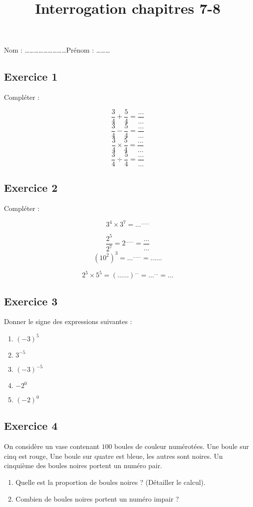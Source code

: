 \documentclass[14 pt]{extarticle}
\title{Interrogation chapitres 7-8}
\date{}
\theoremstyle{plain}
\begin{document}
 
 Nom : \ldots\ldots\ldots\ldots\ldots\ldots\ldots\ldots\ldots Prénom : \ldots\ldots\ldots \\ 
 
 \subsection*{Exercice 1}
 
 Compléter : 
 
 \[ \frac34 + \frac54 = \frac\ldots\ldots   \]
 \[ \frac34 - \frac54 = \frac\ldots\ldots   \]
 \[ \frac34 \times \frac54 = \frac\ldots\ldots   \]
 \[ \frac34 \div \frac54 = \frac\ldots\ldots   \]
 
\subsection*{Exercice 2}

Compléter : 

\[ 3^4 \times 3^7 = \ldots^{\ldots\ldots}
\]

\[ \frac{2^5}{2^7} = 2^{\ldots\ldots} =\frac{\ldots}{\ldots}  \]
\[(10^2)^3 = \ldots^{\ldots\ldots} = \ldots\ldots\]

\[ 2^5 \times 5^5 = ({\ldots\ldots})^{\ldots} = {\ldots}^{\ldots} = \ldots\]

 
 \subsection*{Exercice 3}
 
 Donner le signe des expressions suivantes : \begin{enumerate}
 \item $(-3)^5$ 
 \item $3^{-5}$
 \item $(-3)^{-5}$
 \item $ -2^0$
 \item $(-2)^0$
 \end{enumerate}
 
\subsection*{Exercice 4}

On considère un vase contenant $100$ boules de couleur numérotées. Une boule sur cinq est rouge, Une boule sur quatre est bleue, les autres sont noires. Un cinquième des boules noires portent un numéro pair. 

\begin{enumerate}
\item Quelle est la proportion de boules noires ? (Détailler le calcul). 
\item Combien de boules noires portent un numéro impair ? 
\end{enumerate}
\end{document}
